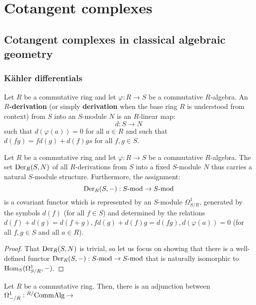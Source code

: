 \section{Cotangent complexes}
    \subsection{Cotangent complexes in classical algebraic geometry}
        \subsubsection{K\"ahler differentials} \label{subsubsection: kahler_differentials}
            \begin{definition} \label{def: kahler_differentials}
                Let $R$ be a commutative ring and let $\varphi: R \to S$ be a commutative $R$-algebra. An \textbf{$R$-derivation} (or simply \textbf{derivation} when the base ring $R$ is understood from context) from $S$ into an $S$-module $N$ is an $R$-linear map:
                    $$d: S \to N$$
                such that $d(\varphi(a)) = 0$ for all $a \in R$ and such that $d(fg) = fd(g) + d(f)gs$ for all $f, g \in S$.
            \end{definition}
            \begin{lemma} \label{lemma: modules_of_derivations}
                Let $R$ be a commutative ring and let $\varphi: R \to S$ be a commutative $R$-algebra. The set $\mathrm{Der}_R(S, N)$ of all $R$-derivations from $S$ into a fixed $S$-module $N$ thus carries a natural $S$-module structure. Furthermore, the assignment:
                    $$\mathrm{Der}_R(S, -): S\text{-}\mathrm{mod} \to S\text{-}\mathrm{mod}$$
                is a covariant functor which is represented by an $S$-module $\Omega^1_{S/R}$, generated by the symbols $d(f)$ (for all $f \in S$) and determined by the relations $d(f) + d(g) = d(f + g), fd(g) + d(f)g = d(fg), d(\varphi(a)) = 0$ (for all $f, g \in S$ and all $a \in R$).
            \end{lemma}
                \begin{proof}
                    That $\mathrm{Der}_R(S, N)$ is trivial, so let us focus on showing that there is a well-defined functor $\mathrm{Der}_R(S, -): S\text{-}\mathrm{mod} \to S\text{-}\mathrm{mod}$ that is naturally isomorphic to $\mathrm{Hom}_S(\Omega^1_{S/R}, -)$. 
                \end{proof}
            \begin{theorem} \label{theorem: kahler_differentials_universal_property}
                Let $R$ be a commutative ring. Then, there is an adjunction between $\Omega^1_{-/R}: {}^{R/}\mathrm{Comm}\mathrm{Alg} \to $ 
            \end{theorem}
            
